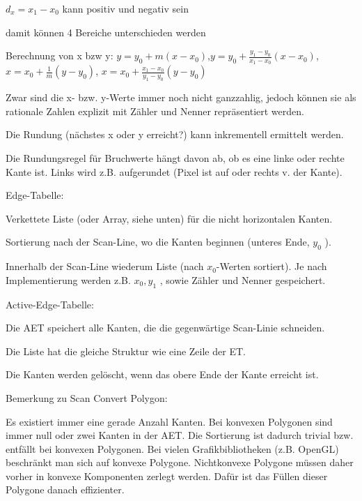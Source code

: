 \documentclass[landscape]{article}
\begin{document}
\begin{multicols}{3}
\begin{itemize*}
\begin{itemize*}
            \item $d_x = x_1 - x_0$ kann positiv und negativ sein
            \item damit können 4 Bereiche unterschieden werden
            \item Berechnung von x bzw y: $y=y_0+m(x-x_0)$,$y=y_0+\frac{y_1-y_0}{x_1-x_0}(x-x_0)$,$x=x_0+\frac{1}{m}(y-y_0)$, $x=x_0+\frac{x_1-x_0}{y_1-y_0}(y-y_0)$
            \item Zwar sind die x- bzw. y-Werte immer noch nicht ganzzahlig, jedoch können sie als rationale Zahlen explizit mit Zähler und Nenner repräsentiert werden.
            \item Die Rundung (nächstes x oder y erreicht?) kann inkrementell ermittelt werden.
            \item Die Rundungsregel für Bruchwerte hängt davon ab, ob es eine linke oder rechte Kante ist. Links wird z.B. aufgerundet (Pixel ist auf oder rechts v. der Kante).
          \end{itemize*}
    \item Edge-Tabelle:
          \begin{itemize*}
            \item  Verkettete Liste (oder Array, siehe unten) für die nicht horizontalen Kanten.
            \item  Sortierung nach der Scan-Line, wo die Kanten beginnen (unteres Ende, $y_0$ ).
            \item  Innerhalb der Scan-Line wiederum Liste (nach $x_0$-Werten sortiert). Je nach Implementierung werden z.B. $x_0 , y_1$ , sowie Zähler und Nenner gespeichert.
          \end{itemize*}
    \item Active-Edge-Tabelle:
          \begin{itemize*}
            \item  Die AET speichert alle Kanten, die die gegenwärtige Scan-Linie schneiden.
            \item  Die Liste hat die gleiche Struktur wie eine Zeile der ET.
            \item  Die Kanten werden gelöscht, wenn das obere Ende der Kante erreicht ist.
          \end{itemize*}
    \item Bemerkung zu Scan Convert Polygon:
          \begin{itemize*}
            \item Es existiert immer eine gerade Anzahl Kanten. Bei konvexen Polygonen sind immer null oder zwei Kanten in der AET. Die Sortierung ist dadurch trivial bzw. entfällt bei konvexen Polygonen. Bei vielen Grafikbibliotheken (z.B. OpenGL) beschränkt man sich auf konvexe Polygone. Nichtkonvexe Polygone müssen daher vorher in konvexe Komponenten zerlegt werden. Dafür ist das Füllen dieser Polygone danach effizienter.

\end{itemize*}
\end{itemize*}
\end{multicols}
\end{document}
